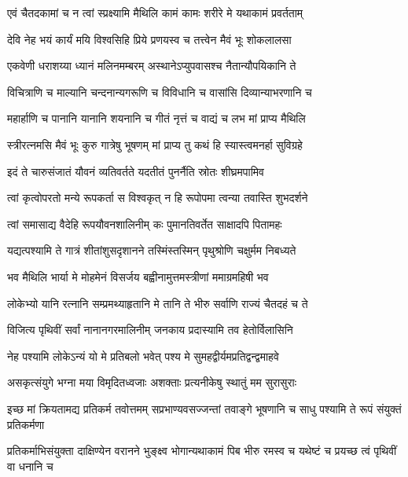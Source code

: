 \twolineshloka
{एवं चैतदकामां च न त्वां स्प्रक्ष्यामि मैथिलि}
{कामं कामः शरीरे मे यथाकामं प्रवर्तताम्} %

\twolineshloka
{देवि नेह भयं कार्यं मयि विश्वसिहि प्रिये}
{प्रणयस्व च तत्त्वेन मैवं भूः शोकलालसा} %

\twolineshloka
{एकवेणी धराशय्या ध्यानं मलिनमम्बरम्}
{अस्थानेऽप्युपवासश्च नैतान्यौपयिकानि ते} %

\twolineshloka
{विचित्राणि च माल्यानि चन्दनान्यगरूणि च}
{विविधानि च वासांसि दिव्यान्याभरणानि च} %

\twolineshloka
{महार्हाणि च पानानि यानानि शयनानि च}
{गीतं नृत्तं च वाद्यं च लभ मां प्राप्य मैथिलि} %

\twolineshloka
{स्त्रीरत्नमसि मैवं भूः कुरु गात्रेषु भूषणम्}
{मां प्राप्य तु कथं हि स्यास्त्वमनर्हा सुविग्रहे} %

\twolineshloka
{इदं ते चारुसंजातं यौवनं व्यतिवर्तते}
{यदतीतं पुनर्नैति स्रोतः शीघ्रमपामिव} %

\twolineshloka
{त्वां कृत्वोपरतो मन्ये रूपकर्ता स विश्वकृत्}
{न हि रूपोपमा त्वन्या तवास्ति शुभदर्शने} %

\twolineshloka
{त्वां समासाद्य वैदेहि रूपयौवनशालिनीम्}
{कः पुमानतिवर्तेत साक्षादपि पितामहः} %

\twolineshloka
{यद्यत्पश्यामि ते गात्रं शीतांशुसदृशानने}
{तस्मिंस्तस्मिन् पृथुश्रोणि चक्षुर्मम निबध्यते} %

\twolineshloka
{भव मैथिलि भार्या मे मोहमेनं विसर्जय}
{बह्वीनामुत्तमस्त्रीणां ममाग्रमहिषी भव} %

\twolineshloka
{लोकेभ्यो यानि रत्नानि सम्प्रमथ्याहृतानि मे}
{तानि ते भीरु सर्वाणि राज्यं चैतदहं च ते} %

\twolineshloka
{विजित्य पृथिवीं सर्वां नानानगरमालिनीम्}
{जनकाय प्रदास्यामि तव हेतोर्विलासिनि} %

\twolineshloka
{नेह पश्यामि लोकेऽन्यं यो मे प्रतिबलो भवेत्}
{पश्य मे सुमहद्वीर्यमप्रतिद्वन्द्वमाहवे} %

\twolineshloka
{असकृत्संयुगे भग्ना मया विमृदितध्वजाः}
{अशक्ताः प्रत्यनीकेषु स्थातुं मम सुरासुराः} %

\threelineshloka
{इच्छ मां क्रियतामद्य प्रतिकर्म तवोत्तमम्}
{सप्रभाण्यवसज्जन्तां तवाङ्गे भूषणानि च}
{साधु पश्यामि ते रूपं संयुक्तं प्रतिकर्मणा} %

\threelineshloka
{प्रतिकर्माभिसंयुक्ता दाक्षिण्येन वरानने}
{भुङ्क्ष्व भोगान्यथाकामं पिब भीरु रमस्व च}
{यथेष्टं च प्रयच्छ त्वं पृथिवीं वा धनानि च} %

